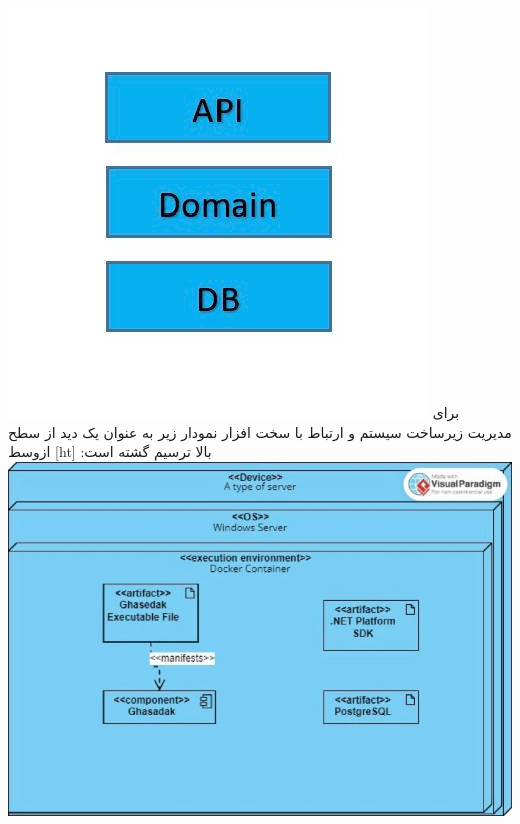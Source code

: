 \includegraphics[scale=0.3]{figs/three_level.jpg}
‫
‫
‫
‫
‫برای مدیریت زیرساخت سیستم و ارتباط با سخت افزار نمودار زیر به عنوان یک دید از سطح بالا ترسیم گشته است:
‫[ht]
‫‌ازوسط
\includegraphics[scale=0.5]{figs/high_level.jpeg}
‫
‫
‫
‫
‫